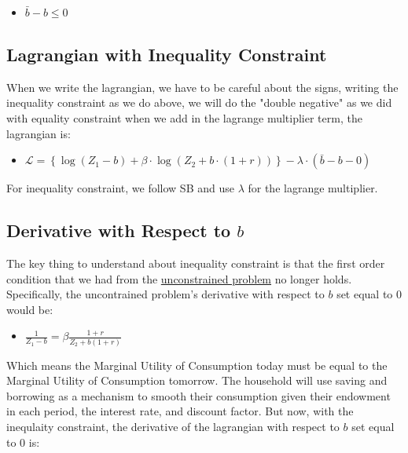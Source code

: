 \documentclass[
]{book}
\providecommand{\tightlist}{%
  \setlength{\itemsep}{0pt}\setlength{\parskip}{0pt}}
\begin{document}
\begin{itemize}
\tightlist
\item
  \(\displaystyle \bar{b} -b\le 0\)
\end{itemize}

\hypertarget{lagrangian-with-inequality-constraint}{%
\subsection{Lagrangian with Inequality Constraint}\label{lagrangian-with-inequality-constraint}}

When we write the lagrangian, we have to be careful about the signs,
writing the inequality constraint as we do above, we will do the
"double negative" as we did with equality constraint when we add in
the lagrange multiplier term, the lagrangian is:

\begin{itemize}
\tightlist
\item
  \(\displaystyle \mathcal{L}=\left\lbrace \log (Z_1 -b)+\beta \cdot \log (Z_2 +b\cdot (1+r))\right\rbrace -\lambda \cdot (\bar{b} -b-0)\)
\end{itemize}

For inequality constraint, we follow SB and use \(\lambda\) for the
lagrange multiplier.

\hypertarget{derivative-with-respect-to-b}{%
\subsection{\texorpdfstring{Derivative with Respect to \(b\)}{Derivative with Respect to b}}\label{derivative-with-respect-to-b}}

The key thing to understand about inequality constraint is that the
first order condition that we had from the \href{https://math4econ.github.io/derivative_application/K_save_households.html}{unconstrained
problem}
no longer holds. Specifically, the uncontrained problem's derivative
with respect to \(b\) set equal to \(0\) would be:

\begin{itemize}
\tightlist
\item
  \(\displaystyle \frac{1}{Z_1 -b}=\beta \frac{1+r}{Z_2 +b(1+r)}\)
\end{itemize}

Which means the Marginal Utility of Consumption today must be equal to
the Marginal Utility of Consumption tomorrow. The household will use
saving and borrowing as a mechanism to smooth their consumption given
their endowment in each period, the interest rate, and discount factor.
But now, with the inequlaity constraint, the derivative of the
lagrangian with respect to \(b\) set equal to \(0\) is:
\end{document}
